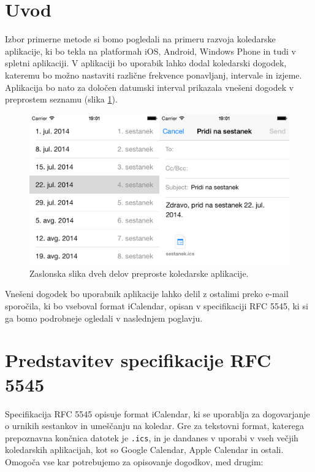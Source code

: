 \section{Uvod}

Izbor primerne metode si bomo pogledali na primeru razvoja koledarske aplikacije, ki bo tekla na platformah iOS, Android, Windows Phone in tudi v spletni aplikaciji. V aplikaciji bo uporabik lahko dodal koledarski dogodek, kateremu bo možno nastaviti različne frekvence ponavljanj, intervale in izjeme. Aplikacija bo nato za določen datumski interval prikazala vnešeni dogodek v preprostem seznamu (slika \ref{fig:app-ios}).

\begin{figure}
 \includegraphics[width=\linewidth]{app-ios}
 \caption{Zaslonska slika dveh delov preproste koledarske aplikacije.}
 \label{fig:app-ios}
\end{figure}

Vnešeni dogodek bo uporabnik aplikacije lahko delil z ostalimi preko e-mail sporočila, ki bo vseboval format iCalendar, opisan v specifikaciji RFC 5545\cite{rfc5545}, ki si ga bomo podrobneje ogledali v naslednjem poglavju.

\section{Predstavitev specifikacije RFC 5545}

Specifikacija RFC 5545\cite{rfc5545} opisuje format iCalendar, ki se uporablja za dogovarjanje o urnikih sestankov in umeščanju na koledar. Gre za tekstovni format, katerega prepoznavna končnica datotek je \texttt{.ics}, in je dandanes v uporabi v vseh večjih koledarskih aplikacijah, kot so Google Calendar, Apple Calendar in ostali. Omogoča vse kar potrebujemo za opisovanje dogodkov, med drugim:

